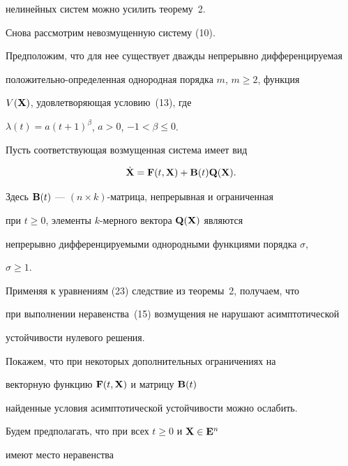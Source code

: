 нелинейных систем можно усилить теорему~2.





Снова рассмотрим невозмущенную систему (10).


Предположим, что для нее существует дважды непрерывно дифференцируемая


положительно-определенная однородная порядка $m$, $m\geq 2$, функция


$V(\bold X)$, удовлетворяющая условию~(13), где


$\lambda(t)=a(t+1)^\beta$, $a>0$, $-1<\beta\leq 0$.





Пусть соответствующая возмущенная система имеет вид


\begin{equation}


\Dot {\bold X}=\bold F(t, \bold X)+\bold B(t) \bold Q(\bold X).


\end{equation}


Здесь $\bold B(t)$ --- $(n\times k)$-матрица, непрерывная и ограниченная


при $t\geq 0$, элементы $k$-мерного вектора $\bold Q(\bold X)$ являются


непрерывно дифференцируемыми однородными функциями порядка $\sigma$,


$\sigma \geq 1$.





Применяя к уравнениям (23) следствие из теоремы~2, получаем, что


при выполнении неравенства~(15) возмущения не нарушают асимптотической


устойчивости нулевого решения.





Покажем, что при некоторых дополнительных ограничениях на


векторную функцию $\bold F(t, \bold X)$ и матрицу $\bold B(t)$


найденные условия асимптотической устойчивости можно ослабить.





Будем предполагать, что при всех $t\geq 0$ и $\bold X\in \bold E^n$


имеют место неравенства


$$


